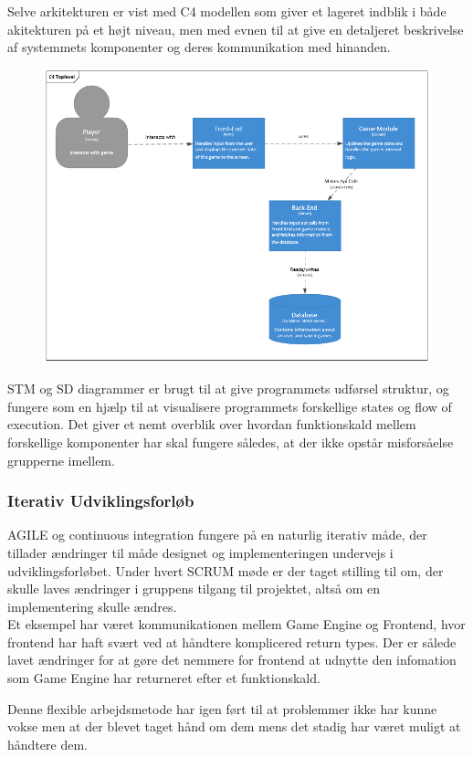 Selve arkitekturen er vist med C4 modellen som giver et lageret indblik i både
akitekturen på et højt niveau, men med evnen til at give en detaljeret beskrivelse
af systemmets komponenter og deres kommunikation med hinanden.

\begin{figure}[H]
  \centering
  \includegraphics[scale=0.8]{02-Body/Images/C4TopLvlDB.PNG}
  \caption{}
  \label{fig:c4}
\end{figure}

STM og SD diagrammer er brugt til at give programmets udførsel struktur, og fungere
som en hjælp til at visualisere programmets forskellige states og flow of execution.
Det giver et nemt overblik over hvordan funktionskald mellem forskellige komponenter
har skal fungere således, at der ikke opstår misforsåelse grupperne imellem. 



\subsubsection{Iterativ Udviklingsforløb}

AGILE og continuous integration fungere på en naturlig iterativ måde, der tillader 
ændringer til måde designet og implementeringen undervejs i udviklingsforløbet.
Under hvert SCRUM møde er der taget stilling til om, der skulle laves ændringer i 
gruppens tilgang til projektet, altså om en implementering skulle ændres. \\

Et eksempel har været kommunikationen mellem Game Engine og Frontend, hvor frontend
har haft svært ved at håndtere komplicered return types. Der er sålede lavet
ændringer for at gøre det nemmere for frontend at udnytte den infomation som Game Engine
har returneret efter et funktionskald.

Denne flexible arbejdsmetode har igen ført til at problemmer ikke har kunne vokse men
at der blevet taget hånd om dem mens det stadig har været muligt at håndtere dem.

